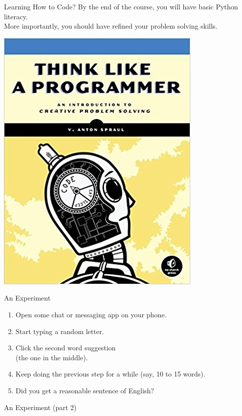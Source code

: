\documentclass[professionalfonts, xcolor={usenames,svgnames,x11names,table}]{beamer}
\begin{document}
\begin{frame}{Learning How to Code?}
    By the end of the course, you will have basic Python literacy.\\
  More importantly, you should have refined your problem solving skills.
    \begin{center} 
         \href{https://www.youtube.com/watch?v=k5iEc6TP_50}{
            \includegraphics[width=.45\linewidth]{img/think}}
    \end{center}
\end{frame}

\begin{frame}{An Experiment}
    \begin{enumerate}
        \item Open some chat or messaging app on your phone.
        \item Start typing a random letter.
        \item Click the second word suggestion\\
              (the one in the middle).
        \item Keep doing the previous step for a while (say, 10 to 15 words).
        \item Did you get a reasonable sentence of English?
    \end{enumerate}

\end{frame}

\begin{frame}{An Experiment (part 2)}
    \begin{center}
    \end{center}
\end{frame}
\end{document}
